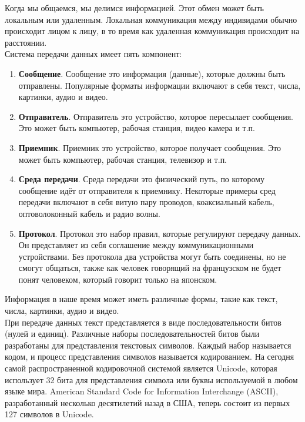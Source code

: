 
\graphicspath{ {imgs/} }




Когда мы общаемся, мы делимся информацией. Этот обмен может быть локальным или удаленным. Локальная коммуникация между индивидами обычно происходит лицом к лицу, в то время как удаленная коммуникация происходит на расстоянии. \\

Система передачи данных имеет пять компонент: \\

\begin{enumerate}
  \item \textbf{Сообщение}. Сообщение это информация (данные), которые должны быть отправлены. Популярные форматы информации включают в себя текст, числа, картинки, аудио и видео.
  \item \textbf{Отправитель}. Отправитель это устройство, которое пересылает сообщения. Это может быть компьютер, рабочая станция, видео камера и т.п.
  \item \textbf{Приемник}. Приемник это устройство, которое получает сообщения. Это может быть компьютер, рабочая станция, телевизор и т.п.
  \item \textbf{Среда передачи}. Среда передачи это физический путь, по которому сообщение идёт от отправителя к приемнику. Некоторые примеры сред передачи включают в себя витую пару проводов, коаксиальный кабель, оптоволоконный кабель и радио волны.
  \item \textbf{Протокол}. Протокол это набор правил, которые регулируют передачу данных. Он представляет из себя соглашение между коммуникационными устройствами. Без протокола два устройства могут быть соединены, но не смогут общаться, также как человек говорящий на французском не будет понят человеком, который говорит только на японском.
\end{enumerate}

Информация в наше время может иметь различные формы, такие как текст, числа, картинки, аудио и видео. \\

При передаче данных текст представляется в виде последовательности битов (нулей и единиц). Различные наборы последовательностей битов были разработаны для представления текстовых символов. Каждый набор называется кодом, и процесс представления символов называется кодированием. На сегодня самой распространенной кодировочной системой является Unicode, которая использует 32 бита для представления символа или буквы используемой в любом языке мира. American Standard Code for Information Interchange (ASCII), разработанный несколько десятилетий назад в США, теперь состоит из первых 127 символов в Unicode. \\

